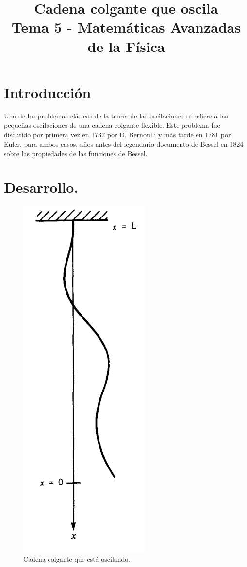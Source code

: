 
\title{Cadena colgante que oscila \\ {\large Tema 5 - Matemáticas Avanzadas de la Física}\vspace{-1.5\baselineskip}}
\date{ }
\author{}

\maketitle
\fontsize{14}{14}\selectfont
\section*{Introducción}
Uno de los problemas clásicos de la teoría de las oscilaciones se refiere a las pequeñas oscilaciones de una cadena colgante flexible. Este problema fue discutido por primera vez en 1732 por D. Bernoulli y más tarde en 1781 por Euler, para ambos casos, años antes del legendario documento de Bessel en 1824 sobre las propiedades de las funciones de Bessel.
\section{Desarrollo.}
\begin{figure}
    \centering
    \includegraphics[scale=0.25]{Imagenes/Cadena_Oscilante.png}
    \caption{Cadena colgante que está oscilando.}
    \label{fig:figura_cadena_01}
\end{figure}

